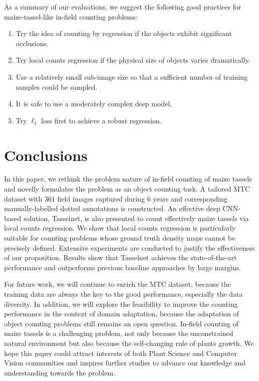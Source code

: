 \documentclass[twocolumn]{bmcart}%
\begin{document}
As a summary of our evaluations, we suggest the following good practices for maize-tassel-like in-field counting problems:
\begin{enumerate}
	\item Try the idea of counting by regression if the objects exhibit significant occlusions.
	\item Try local counts regression if the physical size of objects varies dramatically.
	\item Use a relatively small sub-image size so that a sufficient number of training samples could be sampled.
	\item It is safe to use a moderately complex deep model.
	\item Try $\ell_1$ loss first to achieve a robust regression.
\end{enumerate}

\section*{Conclusions}
%
In this paper, we rethink the problem nature of in-field counting of maize tassels and novelly formulates the problem as an object counting task. A tailored MTC dataset with 361 field images captured during 6 years and corresponding manually-labelled dotted annotations is constructed. An effective deep CNN-based solution, Tasselnet, is also presented to count effectively maize tassels via local counts regression. We show that local counts regression is particularly suitable for counting problems whose ground truth density maps cannot be precisely defined. Extensive experiments are conducted to justify the effectiveness of our proposition. Results show that Tasselnet achieves the state-of-the-art performance and outperforms previous baseline approaches by large margins.

For future work, we will continue to enrich the MTC dataset, because the training data are always the key to the good performance, especially the data diversity. In addition, we will explore the feasibility to improve the counting performance in the context of domain adaptation, because the adaptation of object counting problems still remains an open question. In-field counting of maize tassels is a challenging problem, not only because the unconstrained natural environment but also because the self-changing rule of plants growth. We hope this paper could attract interests of both Plant Science and Computer Vision communities and inspires further studies to advance our knowledge and understanding towards the problem.
\end{document}
